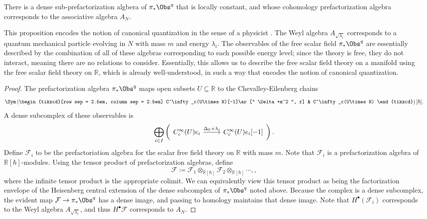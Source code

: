 \begin{proposition}\label{prp:4-4-1}
	There is a dense sub-prefactorization algbera of $\pi _*\Obs^{q} $ that is locally constant, and whose cohomology prefactorization algebra corresponds to the associative algebra $A_N$.
\end{proposition}
\begin{remark}
	This proposition encodes the notion of canonical quantization in the sense of a physicist . The Weyl algebra $A_{\sqrt{\lambda _i} } $ corresponds to a quantum mechanical particle evolving in $N$ with mass $m$ and energy $\lambda _i$. The observables of the free scalar field $\pi _*\Obs^{q} $ are essentially described by the combination of all of these algebras corresponding to each possible energy level; since the theory is free, they do not interact, meaning there are no relations to consider. Essentially, this allows us to describe the free scalar field theory on a manifold using the free scalar field theory on $\mathbb{R} $, which is already well-understood, in such a way that encodes the notion of canonical quantization.
\end{remark}
\begin{proof}
	The prefactorization algebra $\pi _*\Obs^{q} $ maps open subsets $U\subseteq \mathbb{R} $ to the Chevalley-Eilenberg chains
	\[\Sym \left(\begin{tikzcd}[row sep = 2.5em, column sep = 2.5em]
			C^\infty _c(U\times N)[-1]\ar[" \Delta+m^2 ", r]  & C^\infty _c(U\times N)
	\end{tikzcd}\right)[\hbar ].\]
	A dense subcomplex of these observables is
	\[\bigoplus_{i\in I} \left(\begin{tikzcd}[row sep = 2.5em, column sep = 2.5em]
		C^\infty _c(U)e_i\ar[" \Delta _{\mathbb{R} } +\lambda _i ", r]  & C_c^\infty (U)e_i[-1]
	\end{tikzcd}\right).\]
	Define $\mathcal{F} _i$ to be the prefactoriation algebra for the scalar free field theory on $\mathbb{R} $ with mass $m$. Note that $\mathcal{F} _i$ is a prefactorization algebra of $\mathbb{R} [\hbar ]$-modules. Using the tensor product of prefactorization algebras, define
	\[
		\mathcal{F} \coloneqq \mathcal{F} _1 \otimes_{\mathbb{R} [\hbar ]} \mathcal{F} _2 \otimes _{\mathbb{R} [\hbar ]} \cdots ,
	,\]
	where the infinite tensor product is the appropriate colimit. We can equivalently view this tensor product as being the factorization envelope of the Heisenberg central extension of the dense subcomplex of $\pi _*\Obs^{q} $ noted above. Because the complex is a dense subcomplex, the evident map $\mathcal{F} \to \pi _*\Obs^{q} $ has a dense image, and passing to homology maintains that dense image. Note that $H^{\bullet} (\mathcal{F} _i)$ corresponds to the Weyl algebra $A_{\sqrt{\lambda _i} } $, and thus $H^{\bullet} \mathcal{F} $ corresponds to $A_N$.
\end{proof}


